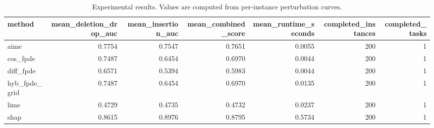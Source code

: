 \begin{table}[t]
\caption{Experimental results. Values are computed from per-instance perturbation curves.}
\label{tab:main_results_computed}
\centering
\begin{tabular}{lrrrrrr}
\toprule
method & mean\_deletion\_drop\_auc & mean\_insertion\_auc & mean\_combined\_score & mean\_runtime\_seconds & completed\_instances & completed\_tasks \\
\midrule
aime & 0.7754 & 0.7547 & 0.7651 & 0.0055 & 200 & 1 \\
cos\_fpde & 0.7487 & 0.6454 & 0.6970 & 0.0044 & 200 & 1 \\
diff\_fpde & 0.6571 & 0.5394 & 0.5983 & 0.0044 & 200 & 1 \\
hyb\_fpde\_grid & 0.7487 & 0.6454 & 0.6970 & 0.0135 & 200 & 1 \\
lime & 0.4729 & 0.4735 & 0.4732 & 0.0237 & 200 & 1 \\
shap & 0.8615 & 0.8976 & 0.8795 & 0.5734 & 200 & 1 \\
\bottomrule
\end{tabular}

\end{table}
